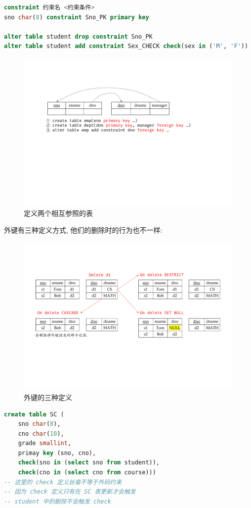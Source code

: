 \begin{lstlisting}[language=SQL, caption={约束命名及其定义}]
constraint 约束名 <约束条件>
sno char(8) constraint Sno_PK primary key

alter table student drop constraint Sno_PK
alter table student add constraint Sex_CHECK check(sex in ('M', 'F'))
\end{lstlisting}

\begin{figure}[H]
    \centering
    \includegraphics[width=.7\textwidth]{figure/相互参照.pdf}
    \caption{定义两个相互参照的表}
\end{figure}

外键有三种定义方式, 他们的删除时的行为也不一样:
\begin{figure}[H]
    \centering
    \includegraphics[width=.8\textwidth]{figure/外键删除.pdf}
    \caption{外键的三种定义}
\end{figure}

\begin{lstlisting}[language=SQL]
create table SC (
    sno char(8),
    cno char(10),
    grade smallint,
    primay key (sno, cno),
    check(sno in (select sno from student)),
    check(cno in (select cno from course)))
-- 这里的 check 定义丝毫不等于外码约束
-- 因为 check 定义只有在 SC 表更新才会触发
-- student 中的删除不会触发 check
\end{lstlisting}


